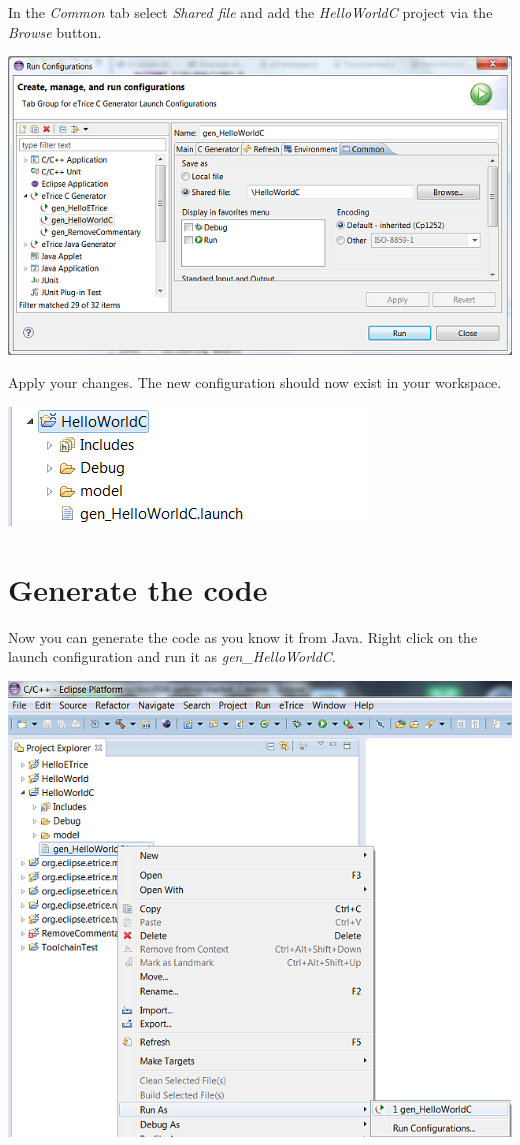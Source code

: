 In the \textit{Common} tab select \textit{Shared file} and add the \textit{HelloWorldC} project via the \textit{Browse} button.

\includegraphics{images/034-HelloWorldC10.png}

Apply your changes. The new configuration should now exist in your workspace.

\includegraphics{images/034-HelloWorldC11.png}


\section{Generate the code}

Now you can generate the code as you know it from Java. Right click on the launch configuration and run it as \textit{gen\_HelloWorldC}.

\includegraphics{images/034-HelloWorldC12.png}

